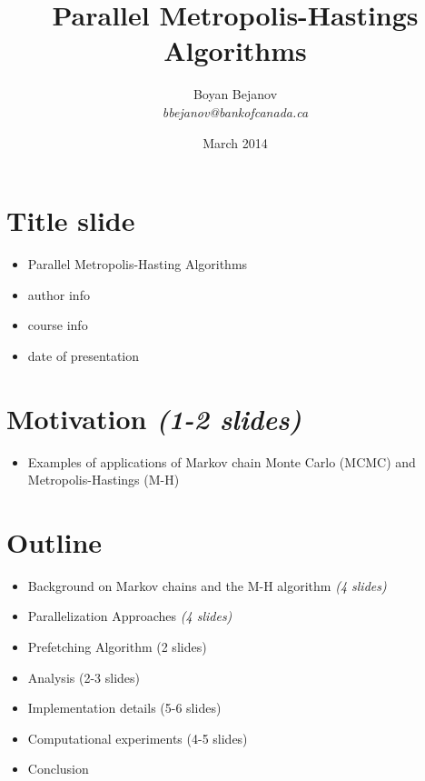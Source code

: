 \documentclass[11pt]{article}       %
\newenvironment{slide}[1]        {\section{#1} \begin{itemize}}%
                                 {\end{itemize}}
\begin{document}


\title{Parallel Metropolis-Hastings Algorithms}
\date{March 2014}

\author{
Boyan Bejanov\\
{\em bbejanov@bankofcanada.ca}
} %

\maketitle

\begin{slide}{Title slide}
\item Parallel Metropolis-Hasting Algorithms
\item author info
\item course info
\item date of presentation
\end{slide}

\begin{slide}{Motivation \emph{(1-2 slides)}    }
\item Examples of applications of Markov chain Monte Carlo (MCMC) and 
    Metropolis-Hastings (M-H)
\end{slide}

\begin{slide}{Outline}
\item Background on Markov chains and the M-H algorithm \emph{(4 slides)}
\item Parallelization Approaches \emph{(4 slides)}
\item Prefetching Algorithm (2 slides)
\item Analysis  (2-3 slides)
\item Implementation details  (5-6 slides)
\item Computational experiments  (4-5 slides)
\item Conclusion 
\end{slide}
\end{document}

